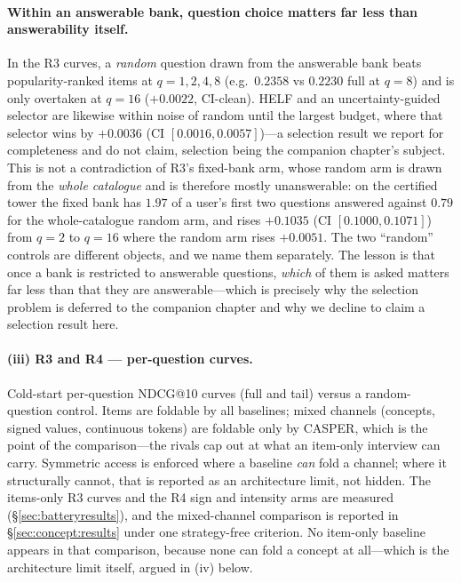 \documentclass[11pt]{article}
\begin{document}
\paragraph{Within an answerable bank, question choice matters far less than answerability itself.}
In the R3 curves, a \emph{random} question drawn from the answerable bank beats popularity-ranked items at
$q{=}1,2,4,8$ (e.g.\ $0.2358$ vs $0.2230$ full at $q{=}8$) and is only overtaken at $q{=}16$ ($+0.0022$,
CI-clean). HELF and an uncertainty-guided selector are likewise within noise of random until the largest
budget, where that selector wins by $+0.0036$ (CI $[0.0016,0.0057]$)---a selection result we report for
completeness and do not claim, selection being the companion chapter's subject. This is not a
contradiction of R3's fixed-bank arm, whose random arm is drawn from the \emph{whole catalogue} and is
therefore mostly unanswerable: on the certified tower the fixed bank has $1.97$ of a user's first two
questions answered against $0.79$ for the whole-catalogue random arm, and rises $+0.1035$
(CI $[0.1000,0.1071]$) from $q{=}2$ to $q{=}16$ where the random arm rises $+0.0051$. The two ``random''
controls are different objects, and we name them separately. The
lesson is that once a bank is restricted to answerable questions, \emph{which} of them is asked matters far
less than that they are answerable---which is precisely why the selection problem is deferred to the
companion chapter and why we decline to claim a selection result here.

\paragraph{(iii) R3 and R4 --- per-question curves.}
Cold-start per-question NDCG@10 curves (full and tail) versus a random-question control. Items are foldable by all
baselines; mixed channels (concepts, signed values, continuous tokens) are foldable only by CASPER, which is
the point of the comparison---the rivals cap out at what an item-only interview can carry. Symmetric access is
enforced where a baseline \emph{can} fold a channel; where it structurally cannot, that is reported as an architecture
limit, not hidden. The items-only R3 curves and the R4 sign and intensity arms are measured
(\S\ref{sec:batteryresults}), and the mixed-channel comparison is reported in \S\ref{sec:concept:results}
under one strategy-free criterion. No item-only baseline appears in that comparison, because none can fold
a concept at all---which is the architecture limit itself, argued in (iv) below.
\end{document}
